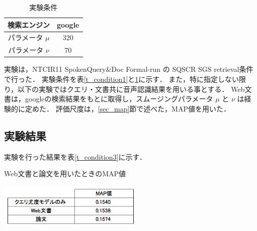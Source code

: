\begin{table}[htbp]
    \begin{center}
        \caption{実験条件}
        \begin{tabular}{|c|c|}
            \hline
            検索エンジン & google \\ \hline
            パラメータ $\mu$ & 320 \\ \hline
            パラメータ $\nu$ & 70 \\ \hline
        \end{tabular}
        \label{t_condition2}
    \end{center}
\end{table}

実験は，NTCIR11 SpokenQuery\&Doc Formal-run の SQSCR SGS retrieval条件で行った．
実験条件を表\ref{t_condition1}と\ref{t_condition2}に示す．
また，特に指定しない限り，以下の実験ではクエリ・文書共に音声認識結果を用いる事とする．
Web文書は，googleの検索結果をもとに取得し，スムージングパラメータ $\mu$ と $\nu$ は経験的に定めた．
評価尺度は，\ref{sec_map}節で述べた，MAP値を用いた．

\subsection{実験結果}
実験を行った結果を表\ref{t_condition3}に示す．

\begin{table}[htbp]
    \centering
    \caption{Web文書と論文を用いたときのMAP値}
    \includegraphics[width=7cm]{./image/t_condition.png}
    \label{t_condition3}
\end{table}








